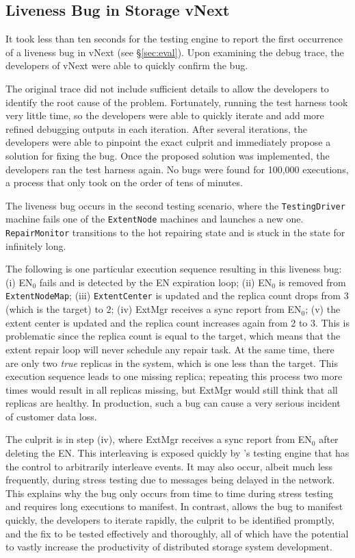 \subsection{Liveness Bug in \Azure Storage vNext}
\label{sec:method:azurestore}

It took less than ten seconds for the \psharp testing engine to report the first occurrence of a liveness bug in vNext (see \S\ref{sec:eval}). Upon examining the debug trace, the developers of vNext were able to quickly confirm the bug.

The original \psharp trace did not include sufficient details to allow the developers to identify the root cause of the problem. Fortunately, running the test harness took very little time, so the developers were able to quickly iterate and add more refined  debugging outputs in each iteration. After several iterations, the developers were able to pinpoint the exact culprit and immediately propose a solution for fixing the bug. Once the proposed solution was implemented, the developers ran the test harness again. No bugs were found for 100,000 executions, a process that only took on the order of tens of minutes.

The liveness bug occurs in the second testing scenario, where the \texttt{TestingDriver} machine fails one of the \texttt{ExtentNode} machines and launches a new one. \texttt{RepairMonitor} transitions to the hot repairing state and is stuck in the state for infinitely long.

The following is one particular execution sequence resulting in this liveness bug: (i) EN$_0$ fails and is detected by the EN expiration loop; (ii) EN$_0$ is removed from \texttt{ExtentNodeMap}; (iii) \texttt{ExtentCenter} is updated and the replica count drops from 3 (which is the target) to 2; (iv) ExtMgr receives a sync report from EN$_0$; (v) the extent center is updated and the replica count increases again from 2 to 3. This is problematic since the replica count is equal to the target, which means that the extent repair loop will never schedule any repair task. At the same time, there are only two \emph{true} replicas in the system, which is one less than the target. This execution sequence leads to one missing replica; repeating this process two more times would result in all replicas missing, but ExtMgr would still think that all replicas are healthy. In production, such a bug can cause a very serious incident of customer data loss.

The culprit is in step (iv), where ExtMgr receives a sync report from EN$_0$ after deleting the EN. This interleaving is exposed quickly by \psharp's testing engine that has the control to arbitrarily interleave events. It may also occur, albeit much less frequently, during stress testing due to messages being delayed in the network. This explains why the bug only occurs from time to time during stress testing and requires long executions to manifest. In contrast, \psharp allows the bug to manifest quickly, the developers to iterate rapidly, the culprit to be identified promptly, and the fix to be tested effectively and thoroughly, all of which have the potential to vastly increase the productivity of distributed storage system development.
